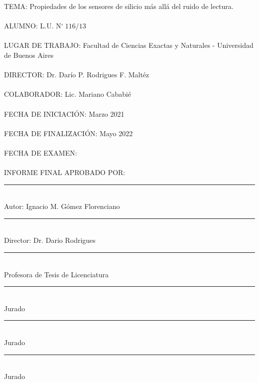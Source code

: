 \thispagestyle{empty}
\noindent TEMA: Propiedades de los sensores de silicio más allá del ruido de lectura.\\
\\
\noindent ALUMNO: L.U. N$^\circ\ 116/13$\\
\\
\noindent LUGAR DE TRABAJO: Facultad de Ciencias Exactas y Naturales - Universidad de Buenos Aires\\
\\
\noindent DIRECTOR: Dr. Darío P. Rodrigues F. Maltéz\\
\\
\noindent COLABORADOR: Lic. Mariano Cababié\\
\\
\noindent FECHA DE INICIACIÓN: Marzo 2021\\
\\
\noindent FECHA DE FINALIZACIÓN:  Mayo 2022\\
\\
\noindent FECHA DE EXAMEN:\\
\\
\noindent INFORME FINAL APROBADO POR:\\
\vfill
\begin{multicols}{2}    
\rule[0pt]{2.5in}{0.5pt}\\
Autor: Ignacio M. Gómez Florenciano
\vspace{3em}

\rule[0pt]{2.5in}{0.5pt}\\
Director: Dr. Dario Rodrigues
\vspace{3em}
   
\rule[0pt]{2.5in}{0.5pt}\\
Profesora de Tesis de Licenciatura
    
\columnbreak
\rule[0pt]{2.5in}{0.5pt}\\
Jurado 
\vspace{3em}
    
\rule[0pt]{2.5in}{0.5pt}\\
Jurado 
\vspace{3em}
    
\rule[0pt]{2.5in}{0.5pt}\\
Jurado 
\end{multicols}  
\newpage
\thispagestyle{empty} \mbox{}
\thispagestyle{empty}
